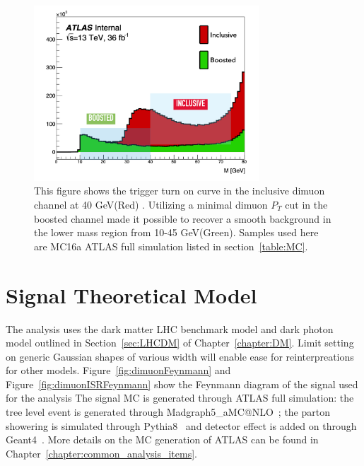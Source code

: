 \begin{figure}[!htb]
    \begin{center}
        \includegraphics[width=0.75\textwidth]{figures/chapter_dimuon/turnon}
        \caption{
        This figure shows the trigger turn on curve in the inclusive dimuon channel at 40 GeV(Red) . Utilizing a minimal dimuon $P_{T}$ cut in the boosted channel made it possible to recover a smooth background in the lower mass region from 10-45 GeV(Green). Samples used here are MC16a ATLAS full simulation listed in section~\ref{table:MC}.
        }
        \label{fig:turnon}
    \end{center}
\end{figure}
\FloatBarrier

\section{Signal Theoretical Model}
The analysis uses the dark matter LHC benchmark model and dark photon model outlined in Section~\ref{sec:LHCDM} of Chapter~\ref{chapter:DM}.
Limit setting on generic Gaussian shapes of various width will enable ease for reinterpreations for other models.
Figure~\ref{fig:dimuonFeynmann} and Figure~\ref{fig:dimuonISRFeynmann} show the Feynmann diagram of the signal used for the analysis 
The signal MC is generated through ATLAS full simulation: the tree level event is generated through Madgraph5\_aMC@NLO~\cite{MG2014}; the parton showering is simulated through Pythia8~\cite{PYTHIA2008} and detector effect is added on through Geant4~\cite{agostinelli2003geant4}. More details on the MC generation of ATLAS can be found in Chapter~\ref{chapter:common_analysis_items}.

